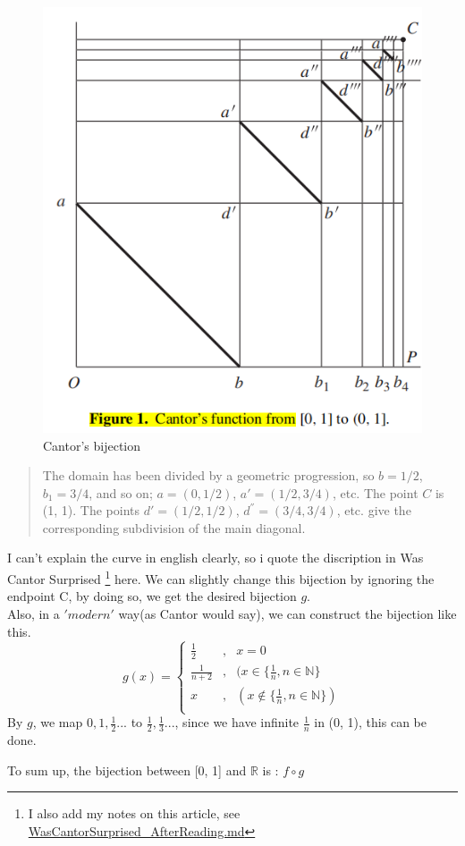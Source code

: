 \documentclass{article}
\begin{document}
    \begin{figure}[h]
        \centering
        \includegraphics[scale = 0.5]{cantor.png}
        \caption{Cantor's bijection}
    \end{figure}
    \begin{quote}
        The domain has been divided by a geometric progression, so $b = 1/2$,$ b_1 = 3/4$, and so on;
            $a = (0, 1/2)$, $a' = (1/2, 3/4)$, etc. The point $C$ is (1, 1). The points $d' = (1/2, 1/2)$, $d^{''} = (3/4, 3/4)$, etc. 
            give the corresponding subdivision of the main diagonal.
    \end{quote}
    I can't explain the curve in english clearly, so i quote the 
    discription in Was Cantor Surprised \footnote{I also add my notes on this article, see \url{WasCantorSurprised_AfterReading.md} } here. 
    We can slightly change this bijection by ignoring the endpoint C, by doing so, we get 
    the desired bijection $g$.\\
    \hspace*{2em} Also, in a $'modern'$ way(as Cantor would say), we can construct the bijection like this.
    \begin{equation}
        g(x) = \left\{
        \begin{aligned}
            \frac{1}{2} &, & x = 0\\
            \frac{1}{n + 2} &, &(x \in \{\frac{1}{n}, n \in \mathbb{N}\}\\
            x &, &(x \notin \{\frac{1}{n}, n \in \mathbb{N}\})\\
        \end{aligned}
        \right.
    \end{equation}
    By $g$, we map $0, 1, \frac{1}{2}...$ to $\frac{1}{2}, \frac{1}{3}...$, since we have infinite $\frac{1}{n}$ in (0, 1), 
    this can be done.

    To sum up, the bijection between [0, 1] and $\mathbb{R}$ is : $f \circ g$
    
\end{document}
